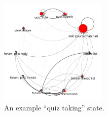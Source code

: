 \begin{figure}
  \centering
  \includegraphics[width=0.45\textwidth]{../figures/text-6state/state0.png}
  \caption{An example ``quiz taking'' state.}
  \label{fig:quiz-state}
\end{figure}
